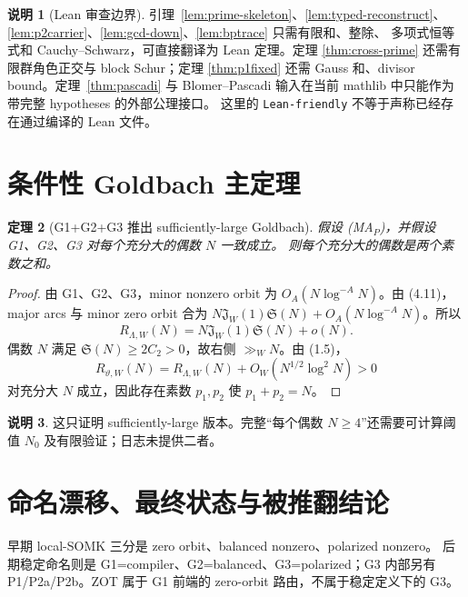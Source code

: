 \documentclass[11pt,a4paper]{ctexart}
\newtheorem{theorem}{定理}[section]
\theoremstyle{definition}
\newtheorem{remark}[theorem]{说明}
\newcommand{\1}{\mathbf 1}
\begin{document}
\begin{remark}[Lean 审查边界]
引理~\ref{lem:prime-skeleton}、\ref{lem:typed-reconstruct}、
\ref{lem:p2carrier}、\ref{lem:gcd-down}、\ref{lem:bptrace} 只需有限和、整除、
多项式恒等式和 Cauchy--Schwarz，可直接翻译为 Lean 定理。定理
\ref{thm:cross-prime} 还需有限群角色正交与 block Schur；定理
\ref{thm:p1fixed} 还需 Gauss 和、divisor bound。定理~\ref{thm:pascadi} 与
Blomer--Pascadi 输入在当前 mathlib 中只能作为带完整 hypotheses 的外部公理接口。
这里的 \texttt{Lean-friendly} 不等于声称已经存在通过编译的 Lean 文件。
\end{remark}

\section{条件性 Goldbach 主定理}

\begin{theorem}[G1+G2+G3 推出 sufficiently-large Goldbach]
假设 \textup{(MA$_P$)}，并假设 G1、G2、G3 对每个充分大的偶数 $N$ 一致成立。
则每个充分大的偶数是两个素数之和。
\end{theorem}

\begin{proof}
由 G1、G2、G3，minor nonzero orbit 为 $O_A(N\log^{-A}N)$。由 (4.11)，
major arcs 与 minor zero orbit 合为
$N\mathfrak J_W(1)\mathfrak S(N)+O_A(N\log^{-A}N)$。所以
\[
R_{\Lambda,W}(N)
=N\mathfrak J_W(1)\mathfrak S(N)+o(N).                 \tag{7.1}
\]
偶数 $N$ 满足 $\mathfrak S(N)\ge2C_2>0$，故右侧 $\gg_WN$。由 (1.5)，
\[
R_{\vartheta,W}(N)
=R_{\Lambda,W}(N)+O_W(N^{1/2}\log^2N)>0                \tag{7.2}
\]
对充分大 $N$ 成立，因此存在素数 $p_1,p_2$ 使 $p_1+p_2=N$。
\end{proof}

\begin{remark}
这只证明 sufficiently-large 版本。完整“每个偶数 $N\ge4$”还需要可计算阈值
$N_0$ 及有限验证；日志未提供二者。
\end{remark}

\section{命名漂移、最终状态与被推翻结论}

早期 local-SOMK 三分是 zero orbit、balanced nonzero、polarized nonzero。
后期稳定命名则是 G1=compiler、G2=balanced、G3=polarized；G3 内部另有
P1/P2a/P2b。ZOT 属于 G1 前端的 zero-orbit 路由，不属于稳定定义下的 G3。
\end{document}
